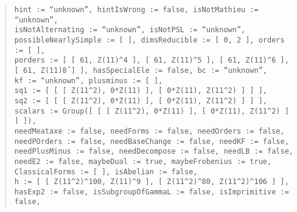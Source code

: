 \documentclass[a4paper,11pt]{article}
\theoremstyle{bla}
\begin{document}
\begin{quote}
  \hspace*{-1cm} \texttt{hint := ``unknown'', hintIsWrong := false, isNotMathieu := ``unknown'',}\\
  \hspace*{-1cm} \texttt{isNotAlternating := ``unknown'', isNotPSL := ``unknown'',}\\
  \hspace*{-1cm} \texttt{possibleNearlySimple := [  ], dimsReducible := [ 0, 2 ], orders := [  ],}\\
  \hspace*{-1cm} \texttt{porders := [ [ 61, Z(11)\^{}4 ], [ 61, Z(11)\^{}5 ], [ 61, Z(11)\^{}6 ],}\\
      \hspace*{-1cm} \texttt{[ 61, Z(11)\^8{} ] ], hasSpecialEle := false, bc := ``unknown'',}\\
  \hspace*{-1cm} \texttt{kf := ``unknown'', plusminus := [  ],}\\
  \hspace*{-1cm} \texttt{sq1 := [ [ [ Z(11\^{}2), 0*Z(11) ], [ 0*Z(11), Z(11\^{}2) ] ] ],}\\
  \hspace*{-1cm} \texttt{sq2 := [ [ [ Z(11\^{}2), 0*Z(11) ], [ 0*Z(11), Z(11\^{}2) ] ] ],}\\
  \hspace*{-1cm} \texttt{scalars := Group([ [ [ Z(11\^{}2), 0*Z(11) ], [ 0*Z(11), Z(11\^{}2) ] ] ]),}\\
  \hspace*{-1cm} \texttt{needMeataxe := false, needForms := false, needOrders := false,}\\
  \hspace*{-1cm} \texttt{needPOrders := false, needBaseChange := false, needKF := false,}\\
  \hspace*{-1cm} \texttt{needPlusMinus := false, needDecompose := false, needLB := false,}\\
  \hspace*{-1cm} \texttt{needE2 := false, maybeDual := true, maybeFrobenius := true,}\\
  \hspace*{-1cm} \texttt{ClassicalForms := [  ], isAbelian := false,}\\
  \hspace*{-1cm} \texttt{h := [ [ Z(11\^{}2)\^{}100, Z(11)\^{}9 ], [ Z(11\^{}2)\^{}80, Z(11\^{}2)\^{}106 ] ],}\\
  \hspace*{-1cm} \texttt{hasExp2 := false, isSubgroupOfGammaL := false, isImprimitive := false,}\\

\end{quote}
\end{document}
